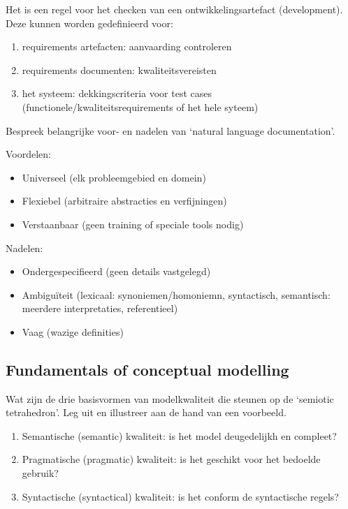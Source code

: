 \documentclass{article}
\begin{document}
Het is een regel voor het checken van een ontwikkelingsartefact (development). Deze kunnen worden gedefinieerd voor:
\begin{enumerate}
    \item requirements artefacten: aanvaarding controleren
    \item requirements documenten: kwaliteitsvereisten
    \item het systeem: dekkingscriteria voor test cases (functionele/kwaliteitsrequirements of het hele syteem)
\end{enumerate}

\begin{quest}Bespreek belangrijke voor- en nadelen van `natural language documentation'.
\end{quest}

Voordelen: 
\begin{itemize}
    \item Universeel (elk probleemgebied en domein)
    \item Flexiebel (arbitraire abstracties en verfijningen)
    \item Verstaanbaar (geen training of speciale tools nodig)
\end{itemize}
Nadelen:
\begin{itemize}
    \item Ondergespecifieerd (geen details vastgelegd)
    \item Ambigu\"iteit (lexicaal: synoniemen/homoniemn, syntactisch, semantisch: meerdere interpretaties, referentieel)
    \item Vaag (wazige definities)
\end{itemize}

\setcounter{subsection}{18}
\subsection{Fundamentals of conceptual modelling}

\begin{quest}Wat zijn de drie basisvormen van modelkwaliteit die steunen op de `semiotic tetrahedron'. Leg uit en illustreer aan de hand van een voorbeeld.
\end{quest}

\begin{enumerate}
    \item Semantische (semantic) kwaliteit: is het model deugedelijkh en compleet?
    \item Pragmatische (pragmatic) kwaliteit: is het geschikt voor het bedoelde gebruik?
    \item Syntactische (syntactical) kwaliteit: is het conform de syntactische regels?
\end{enumerate}
\end{document}
